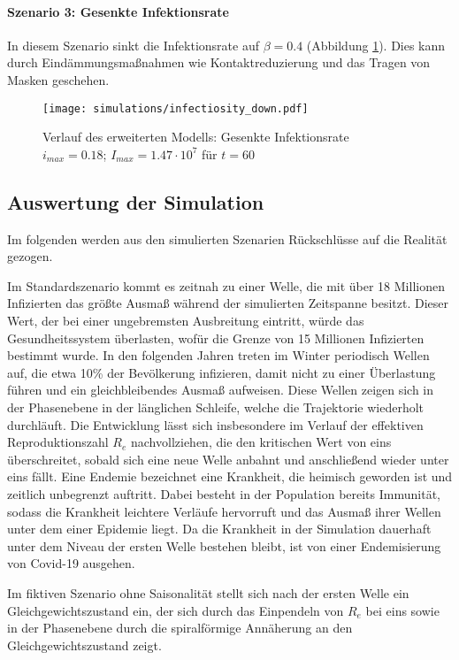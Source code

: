 \documentclass[../main.tex]{subfiles}
\begin{document}
    \paragraph{Szenario 3: Gesenkte Infektionsrate}
    In diesem Szenario sinkt die Infektionsrate auf $\beta=0.4$ (Abbildung \ref{fig:sim_infectiosity_down}). Dies kann durch Eindämmungsmaßnahmen wie Kontaktreduzierung und das Tragen von Masken geschehen.
    \begin{figure}
        \centerline{\texttt{[image: simulations/infectiosity\_down.pdf]}}
        \caption[Verlauf des erweiterten Modells: Gesenkte Infektionsrate]{Verlauf des erweiterten Modells: Gesenkte Infektionsrate \\ $i_{max}=0.18$; $I_{max}=1.47 \cdot 10^7$ für $t=60$}
        \label{fig:sim_infectiosity_down}
    \end{figure}


    \subsection{Auswertung der Simulation}
    Im folgenden werden aus den simulierten Szenarien Rückschlüsse auf die Realität gezogen.

    Im Standardszenario kommt es zeitnah zu einer Welle, die mit über 18 Millionen Infizierten das größte Ausmaß während der simulierten Zeitspanne besitzt. Dieser Wert, der bei einer ungebremsten Ausbreitung eintritt, würde das Gesundheitssystem überlasten, wofür die Grenze von 15 Millionen Infizierten bestimmt wurde.
    In den folgenden Jahren treten im Winter periodisch Wellen auf, die etwa 10\% der Bevölkerung infizieren, damit nicht zu einer Überlastung führen und ein gleichbleibendes Ausmaß aufweisen. Diese Wellen zeigen sich in der Phasenebene in der länglichen Schleife, welche die Trajektorie wiederholt durchläuft. Die Entwicklung lässt sich insbesondere im Verlauf der effektiven Reproduktionszahl $R_e$ nachvollziehen, die den kritischen Wert von eins überschreitet, sobald sich eine neue Welle anbahnt und anschließend wieder unter eins fällt. Eine Endemie bezeichnet eine Krankheit, die heimisch geworden ist und zeitlich unbegrenzt auftritt. Dabei besteht in der Population bereits Immunität, sodass die Krankheit leichtere Verläufe hervorruft und das Ausmaß ihrer Wellen unter dem einer Epidemie liegt. Da die Krankheit in der Simulation dauerhaft unter dem Niveau der ersten Welle bestehen bleibt, ist von einer Endemisierung von Covid-19 ausgehen.

    Im fiktiven Szenario ohne Saisonalität stellt sich nach der ersten Welle ein Gleichgewichtszustand ein, der sich durch das Einpendeln von $R_e$ bei eins sowie in der Phasenebene durch die spiralförmige Annäherung an den Gleichgewichtszustand zeigt.
\end{document}
